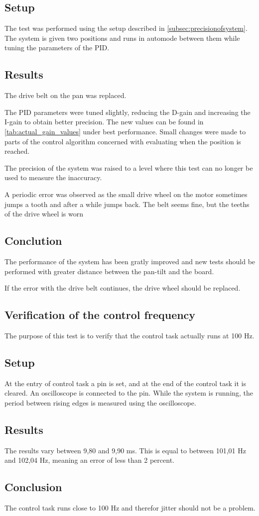 \subsection*{Setup}
The test was performed using the setup described in \ref{subsec:precisionofsystem}. The
system is given two positions and runs in automode between them while tuning the
parameters of the PID.

\subsection*{Results}
The drive belt on the pan was replaced.

The PID parameters were tuned slightly, reducing the D-gain and increasing the
I-gain to obtain better precision. The new values can be found in
\ref{tab:actual_gain_values} under best performance. Small changes were made to
parts of the control algorithm concerned with evaluating when the position is reached.

The precision of the system was raised to a level where this test can no
longer be used to measure the inaccuracy. 

A periodic error was observed as the small drive wheel on the motor sometimes
jumps a tooth and after a while jumps back. The belt seems fine, but
the teeths of the drive wheel is worn

\subsection*{Conclution}
The performance of the system has been gratly improved and new tests should be
performed with greater distance between the pan-tilt and the board. 

If the error with the drive belt continues, the drive wheel should be replaced.


\subsection{Verification of the control frequency}
The purpose of this test is to verify that the control task actually runs at 100 Hz.

\subsection*{Setup}
At the entry of control task a pin is set, and at the end of the control task it
is cleared. An oscilloscope is connected to the pin. While the system is running, the period between rising edges is measured using the oscilloscope.

\subsection*{Results}
The results vary between 9,80 and 9,90 ms. This is equal to between 101,01 Hz and 102,04 Hz, meaning an error of less than 2 percent.

\subsection*{Conclusion}
The control task runs close to 100 Hz and therefor jitter should not be a problem.









